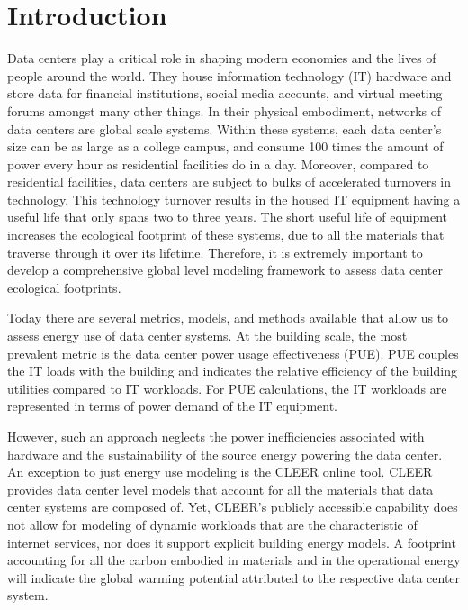 \section{Introduction}

Data centers play a critical role in shaping modern economies and the lives of people around the world. They house information technology (IT) hardware and store data for financial institutions, social media accounts, and virtual meeting forums amongst many other things. In their physical embodiment, networks of data centers are global scale systems. Within these systems, each data center’s size can be as large as a college campus, and consume 100 times the amount of power every hour as residential facilities do in a day. Moreover, compared to residential facilities, data centers are subject to bulks of accelerated turnovers in technology. This technology turnover results in the housed IT equipment having a useful life that only spans two to three years. The short useful life of equipment increases the ecological footprint of these systems, due to all the materials that traverse through it over its lifetime. Therefore, it is extremely important to develop a comprehensive global level modeling framework to assess data center ecological footprints. 

Today there are several metrics, models, and methods available that allow us to assess energy use of data center systems. At the building scale, the most prevalent metric is the data center power usage effectiveness (PUE). PUE couples the IT loads with the building and indicates the relative efficiency of the building utilities compared to IT workloads. For PUE calculations, the IT workloads are represented in terms of power demand of the IT equipment. 

However, such an approach neglects the power inefficiencies associated with hardware and the sustainability of the source energy powering the data center. An exception to just energy use modeling is the CLEER online tool. CLEER provides data center level models that account for all the materials that data center systems are composed of. Yet, CLEER’s publicly accessible capability does not allow for modeling of dynamic workloads that are the characteristic of internet services, nor does it support explicit building energy models. A footprint accounting for all the carbon embodied in materials and in the operational energy will indicate the global warming potential attributed to the respective data center system.


